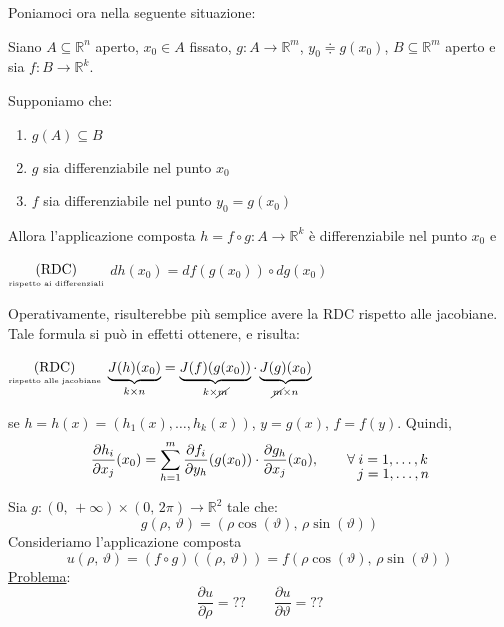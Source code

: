 Poniamoci ora nella seguente situazione:
\begin{center}
\def\svgwidth{14cm}

\end{center}

\begin{thm}
Siano $A \subseteq \mathbb{R}^n$ aperto, $x_0 \in A$ fissato, $g : A \longrightarrow \mathbb{R}^m$, $y_0 \doteqdot g(x_0)$, $B \subseteq \mathbb{R}^m$ aperto e sia $f : B \longrightarrow \mathbb{R}^k$.

Supponiamo che:
\begin{enumerate}[labelindent=\parindent,leftmargin=*,label=\textnormal{(\roman*)},start=1]
\item $g(A) \subseteq B$
\item $g$ sia differenziabile nel punto $x_0$
\item $f$ sia differenziabile nel punto $y_0 = g(x_0)$
\end{enumerate}
Allora l'applicazione composta $h = f \circ g : A \longrightarrow \mathbb{R}^k$ è differenziabile nel punto $x_0$ e
\begin{center}
$\underset{\text{\tiny rispetto ai differenziali}}{\mathrm{(RDC)}}$
\hfill
$\displaystyle dh(x_0) = df(g(x_0)) \circ dg(x_0)$
\hfill \null \\
\end{center}
\end{thm}

\begin{obs}[importante]
Operativamente, risulterebbe più semplice avere la RDC rispetto alle jacobiane. Tale formula si può in effetti ottenere, e risulta:
\begin{center}
$\underset{\text{\tiny rispetto alle jacobiane}}{\mathrm{(RDC)}}$
\hfill
$\displaystyle \underbrace{J(h)(x_0)}_{k \times n} = \underbrace{J(f)(g(x_0))}_{k \times \cancel{m}} \cdot \underbrace{J(g)(x_0)}_{\cancel{m} \times n}$
\hfill \null \\
\end{center}
se $h=h(x)=(h_1(x),\ldots,h_k(x))$, $y=g(x)$, $f=f(y)$. Quindi,
$$
\frac{\partial h_i}{\partial x_j}(x_0) = \sum_{h=1}^{m} \frac{\partial f_i}{\partial y_h}(g(x_0)) \cdot \frac{\partial g_h}{\partial x_j}(x_0), \qquad \forall \, \underset{\text{\normalsize $j=1,\ldots,n$}}{i=1,\ldots,k}
$$
\end{obs}

\begin{example}

Sia $g : (0,\,+\infty) \times (0,\,2\pi) \longrightarrow \mathbb{R}^2$ tale che:
$$
g(\rho,\,\vartheta) = \left( \rho\cos(\vartheta) ,\, \rho\sin(\vartheta) \right)
$$
Consideriamo l'applicazione composta
$$
u(\rho,\,\vartheta) = (f \circ g)((\rho,\,\vartheta)) = f\left( \rho\cos(\vartheta) ,\, \rho\sin(\vartheta) \right)
$$
\underline{Problema}:
$$
\frac{\partial u}{\partial \rho} = ?? \qquad \frac{\partial u}{\partial \vartheta} = ??
$$
\end{example}

